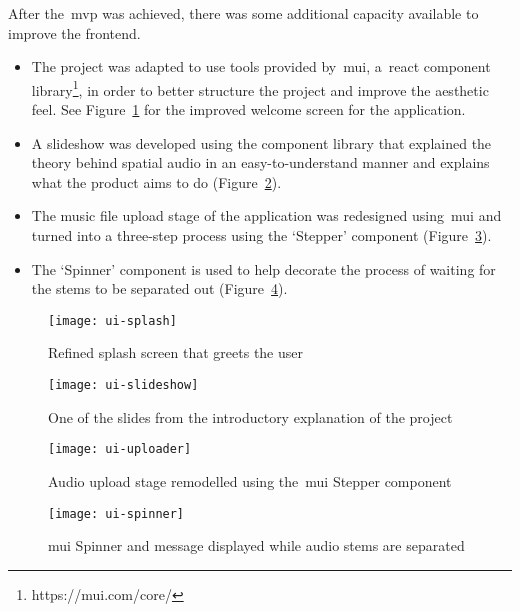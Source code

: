 After the~\gls{mvp} was achieved, there was some additional capacity available to improve the frontend.

\begin{itemize}
    \item The project was adapted to use tools provided by~\gls{mui},
    a~\gls{react} component library\footnote{https://mui.com/core/},
    in order to better structure the project and improve the aesthetic feel.
    See Figure~\ref{fig:ui-splash} for the improved welcome screen for the application.
    \item A slideshow was developed using the component library that explained the theory behind spatial audio in an easy-to-understand manner and explains what the product aims to do (Figure~\ref{fig:ui-slideshow}).
    \item The music file upload stage of the application was redesigned using~\gls{mui} and turned into a three-step process using the `Stepper' component (Figure~\ref{fig:ui-uploader}).
    \item The `Spinner' component is used to help decorate the process of waiting for the stems to be separated out (Figure~\ref{fig:ui-spinner}).
\end{itemize}

\begin{figure}[!htb]
    \minipage{\textwidth}
    \texttt{[image: ui-splash]}
    \caption{Refined splash screen that greets the user}\label{fig:ui-splash}
    \endminipage\hfill
\end{figure}

\begin{figure}[!htb]
    \minipage{\textwidth}
    \texttt{[image: ui-slideshow]}
    \caption{One of the slides from the introductory explanation of the project}\label{fig:ui-slideshow}
    \endminipage\hfill
\end{figure}

\begin{figure}[!htb]
    \minipage{\textwidth}
    \texttt{[image: ui-uploader]}
    \caption{Audio upload stage remodelled using the~\gls{mui} Stepper component}\label{fig:ui-uploader}
    \endminipage\hfill
\end{figure}

\begin{figure}[!htb]
    \minipage{\textwidth}
    \texttt{[image: ui-spinner]}
    \caption{\gls{mui} Spinner and message displayed while audio stems are separated}\label{fig:ui-spinner}
    \endminipage
\end{figure}


